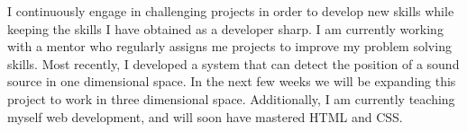 
\begin{cvparagraph}

I continuously engage in challenging projects in order to develop new skills while keeping the skills I have obtained as a developer sharp. I am currently working with a mentor who regularly assigns me projects to improve my problem solving skills. Most recently, I developed a system that can detect the position of a sound source in one dimensional space. In the next few weeks we will be expanding this project to work in three dimensional space. Additionally, I am currently teaching myself web development, and will soon have mastered HTML and CSS.
\end{cvparagraph}
